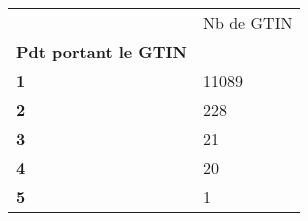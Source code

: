 \begin{tabularx}{\linewidth}{lX}
\toprule
{} &  Nb de GTIN \\
\textbf{Pdt portant le GTIN} &             \\
\midrule
\textbf{1                  } &       11089 \\
\textbf{2                  } &         228 \\
\textbf{3                  } &          21 \\
\textbf{4                  } &          20 \\
\textbf{5                  } &           1 \\
\bottomrule
\end{tabularx}
